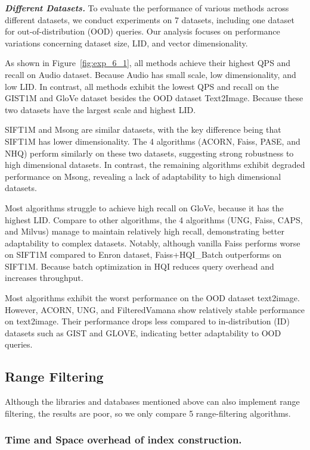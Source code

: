 \documentclass[sigconf, nonacm]{acmart}
\begin{document}
	\textit{\textbf{Different Datasets.}}  
	To evaluate the performance of various methods across different datasets, we conduct experiments on 7 datasets, including one dataset for out-of-distribution (OOD) queries. Our analysis focuses on performance variations concerning dataset size, LID, and vector dimensionality.
	
	As shown in Figure~\ref{fig:exp_6_1}, all methods achieve their highest QPS and recall on Audio dataset. Because Audio has small scale, low dimensionality, and low LID. In contrast, all methods exhibit the lowest QPS and recall on the GIST1M and GloVe dataset besides the OOD dataset Text2Image. Because these two datasets have the largest scale and highest LID.
	
	SIFT1M and Msong are similar datasets, with the key difference being that SIFT1M has lower dimensionality. The 4 algorithms (ACORN, Faiss, PASE, and NHQ) perform similarly on these two datasets, suggesting strong robustness to high dimensional datasets. In contrast, the remaining algorithms exhibit degraded performance on Msong, revealing a lack of adaptability to high dimensional datasets.
	
	Most algorithms struggle to achieve high recall on GloVe, because it has the highest LID. Compare to other algorithms, the 4 algorithms (UNG, Faiss, CAPS, and Milvus) manage to maintain relatively high recall, demonstrating better adaptability to complex datasets. Notably, although vanilla Faiss performs worse on SIFT1M compared to Enron dataset, Faiss+HQI\_Batch outperforms on SIFT1M. Because batch optimization in HQI reduces query overhead and increases throughput.
	
	Most algorithms exhibit the worst performance on the OOD dataset text2image. However, ACORN, UNG, and FilteredVamana show relatively stable performance on text2image. Their performance drops less compared to in-distribution (ID) datasets such as GIST and GLOVE, indicating better adaptability to OOD queries.
	
	\subsection{Range Filtering}
	Although the libraries and databases mentioned above can also implement range filtering, the results are poor, so we only compare 5 range-filtering algorithms.
	\subsubsection{Time and Space overhead of index construction.}
	
\end{document}
